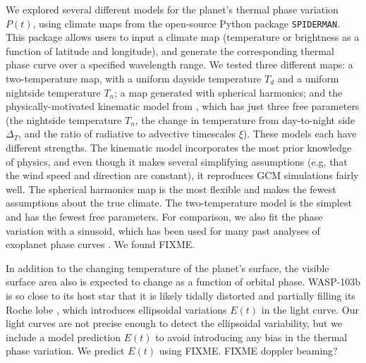 \documentclass[twocolumn]{aastex61}
\begin{document}
We explored several different models for the planet's thermal phase variation $P(t)$, using climate maps from the open-source Python package \texttt{SPIDERMAN}. This package allows users to input a climate map (temperature or brightness as a function of latitude and longitude), and generate the corresponding thermal phase curve over a specified wavelength range. We tested three different maps:  a two-temperature map, with a uniform dayside temperature $T_d$ and a uniform nightside temperature $T_n$; a map generated with spherical harmonics; and the physically-motivated kinematic model from \cite{zhang16}, which has just three free parameters (the nightside temperature $T_n$, the change in temperature from day-to-night side $\Delta_T$, and the ratio of radiative to advective timescales $\xi$). These models each have different strengths. The kinematic model incorporates the most prior knowledge of physics, and even though it makes several simplifying assumptions (e.g, that the wind speed and direction are constant), it reproduces GCM simulations fairly well.   The spherical harmonics map is the most flexible and makes the fewest assumptions about the true climate. The two-temperature model is the simplest and has the fewest free parameters.  
For comparison, we also fit the phase variation with a sinusoid, which has been used for many past analyses of exoplanet phase curves \citep[e.g.]{FIXME}.  We found FIXME.

In addition to the changing temperature of the planet's surface, the visible surface area also is expected to change as a function of orbital phase.  WASP-103b is so close to its host star that it is likely tidally distorted and partially filling its Roche lobe \citep{gillon14}, which introduces ellipsoidal variations $E(t)$ in the light curve.  Our light curves are not precise enough to detect the ellipsoidal variability, but we include a model prediction $E(t)$ to avoid introducing any bias in the thermal phase variation. We predict $E(t)$ using FIXME. FIXME doppler beaming?
\end{document}
